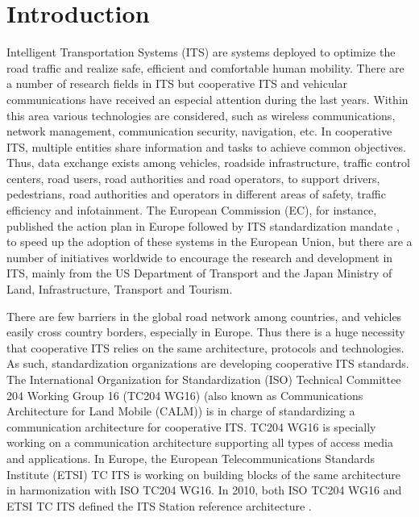 \documentclass[fonts]{icst}
\begin{document}



\maketitle

\section{Introduction}

Intelligent Transportation Systems (ITS) are systems deployed to optimize the road traffic and realize safe, efficient and comfortable human mobility. There are a number of research fields in ITS but cooperative ITS and vehicular communications have received an especial attention during the last years. Within this area various technologies are considered, such as wireless communications, network management, communication security, navigation, etc.
In cooperative ITS, multiple entities share information and tasks to achieve common objectives. Thus, data exchange exists among vehicles, roadside infrastructure, traffic control centers, road users, road authorities and road operators, to support drivers, pedestrians, road authorities and operators in different areas of safety, traffic efficiency and infotainment. The European Commission (EC), for instance, published the action plan \cite{EC-COM-886:Action-plan} in Europe followed by ITS standardization mandate \cite{EC-M/453}, to speed up the adoption of these systems in the European Union, but there are a number of initiatives worldwide to encourage the research and development in ITS, mainly from the US Department of Transport and the Japan Ministry of Land, Infrastructure, Transport and Tourism. 

There are few barriers in the global road network among countries, and vehicles easily cross country borders, especially in Europe. Thus there is a huge necessity that cooperative ITS relies on the same architecture, protocols and technologies. As such, standardization organizations are developing cooperative ITS standards.
The International Organization for Standardization (ISO) Technical Committee 204 Working Group 16 (TC204 WG16) (also known as Communications Architecture for Land Mobile (CALM)) is in charge of standardizing a communication architecture for cooperative ITS. TC204 WG16 is specially working on a communication architecture supporting all types of access media and applications. In Europe, the European Telecommunications Standards Institute (ETSI) TC ITS is working on building blocks of the same architecture in harmonization with ISO TC204 WG16. In 2010, both ISO TC204 WG16 and ETSI TC ITS defined the ITS Station reference architecture \cite{ISO-21217-CALM-Arch, ETSI-EN-302-665-Arch}.
\end{document}

